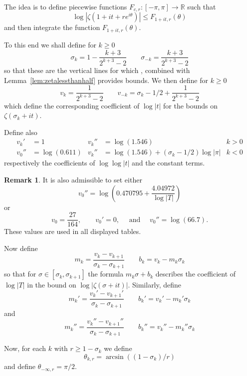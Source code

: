 \documentclass[10pt,english,letter, reqno]{amsart}
\theoremstyle{plain}
\theoremstyle{definition}
\newtheorem{remark}[theorem]{Remark}
\begin{document}
The idea is to define piecewise functions
 $F_{c,r} : [-\pi,\pi] \rightarrow \mathbb{R}$ such that 
 \[ \log|\zeta(1+ it +re^{i\theta} )| \leq F_{1+ it,r}(\theta) \]
 and then integrate the function $F_{1+ it,r}(\theta) $.


To this end we shall define for $k\geq 0$
\begin{equation} \label{eq:sigmak} \sigma_k =  1-\frac{k+3}{2^{k+3}-2} \qquad  \sigma_{-k} = \frac{k+3}{2^{k+3}-2} \end{equation}
so that these are the vertical lines for which \cite{Yang2024}, combined with Lemma~\ref{lem:zetalessthanhalf} provides bounds.
We then define for $k\geq 0$
\[ v_k = \frac{1}{2^{k+3}-2}  \qquad  v_{-k} = \sigma_k-1/2 + \frac{1}{2^{k+3}-2} \]
which define the corresponding coefficient of $\log|t|$ for the bounds on $\zeta(\sigma_k+it)$.

Define also
\begin{align*}  v_k' &= 1  & v_k'' &= \log(1.546)& k>0\\
v_0'' &= \log(0.611) 
 &  v_k'' & = \log(1.546)+(\sigma_k-1/2)\log|\pi|& k<0
\end{align*}
respectively the coefficients of $\log\log|t|$ and the constant terms.

\begin{remark}\label{rem:altcoefficients}
It is also admissible to set either
\[ v_0'' =\log\left( 0.470795  + \frac{4.04972}{\log|T|} \right) \]
or
\[ v_0=\frac{27}{164},\qquad v_0' = 0,\quad  \text{  and  }\quad v_0'' = \log(66.7). \]
These values are used in all displayed tables.
\end{remark}

Now define
\begin{equation}\label{eq:mk} m_{k} = \frac{v_k-v_{k+1}}{\sigma_k - \sigma_{k+1}} \qquad   b_{k} = v_k - m_{k}\sigma_k \end{equation}
so that for $\sigma\in[\sigma_k,\sigma_{k+1}]$ the formula $m_k\sigma+b_k$ describes the coefficient of $\log|T|$ in the bound on $\log|\zeta(\sigma+it)|$.
Similarly, define
\begin{equation}\label{eq:mkp}m_k' =  \frac{v_k'-v_{k+1}'}{\sigma_k - \sigma_{k+1}} \qquad b_{k}' = v_k' - m_{k}'\sigma_k \end{equation}
and
\begin{equation}\label{eq:mkpp}m_k'' =  \frac{v_k''-v_{k+1}''}{\sigma_k - \sigma_{k+1}} \qquad b_{k}'' = v_k'' - m_{k}''\sigma_k \end{equation}

Now, for each $k$ with $r\geq 1-\sigma_k$ we define
\begin{equation}\label{eq:thetak} \theta_{k,r} = \arcsin((1-\sigma_k)/r) \end{equation}
and define $\theta_{-\infty,r} = \pi/2$.
\end{document}
